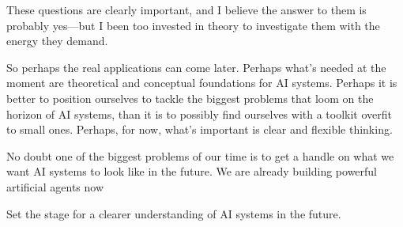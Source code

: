 %


These questions are clearly important, and I believe the answer to them is probably yes---but I been too invested in theory to investigate them with the energy they demand.  



So perhaps the real applications can come later. 
Perhaps what's needed at the moment are theoretical and conceptual foundations for AI systems. 
Perhaps it is better to position ourselves to tackle the biggest problems that loom on the horizon of AI systems, than it is to possibly find ourselves with a toolkit overfit to small ones. 
Perhaps, for now, what's important is clear and flexible thinking. 


No doubt one of the biggest problems of our time is to get a handle on what we want AI systems to look like in the future.  We are already building powerful artificial agents now 


Set the stage for a clearer understanding of AI systems in the future.

